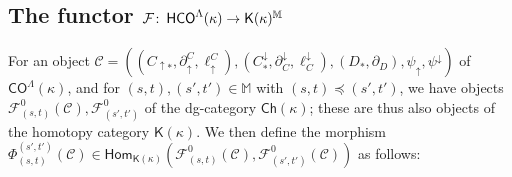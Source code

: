 \documentclass[11pt]{amsart}
\theoremstyle{definition}
\theoremstyle{remark}
\numberwithin{equation}{section}
\def\co{\colon\thinspace}
\begin{document}
\subsection{The functor $\mathcal{F}\co \mathsf{HCO}^{\Lambda}(\kappa)\to \mathsf{K}(\kappa)^{\mathbb{M}}$} \label{fsect}

For an object $\mathcal{C}=\left((C_{\uparrow *},\partial_{\uparrow}^C,\ell_{\uparrow}^C),(C^{\downarrow}_{*},\partial^{\downarrow}_C,\ell^{\downarrow}_C),(D_*,\partial_D),\psi_{\uparrow},\psi^{\downarrow}\right)$ of $\mathsf{CO}^{\Lambda}(\kappa)$, and for $(s,t),(s',t')\in\mathbb{M}$ with $(s,t)\preceq (s',t')$, we have objects $\mathcal{F}^{0}_{(s,t)}(\mathcal{C}),\mathcal{F}^{0}_{(s',t')}$ of the dg-category $\mathsf{Ch}(\kappa)$; these are thus also objects of the homotopy category $\mathsf{K}(\kappa)$.  We then define the morphism $\Phi_{(s,t)}^{(s',t')}(\mathcal{C})\in \mathsf{Hom}_{\mathsf{K}(\kappa)}( \mathcal{F}^{0}_{(s,t)}(\mathcal{C}),\mathcal{F}^{0}_{(s',t')}(\mathcal{C}))$ as follows:
\end{document}
